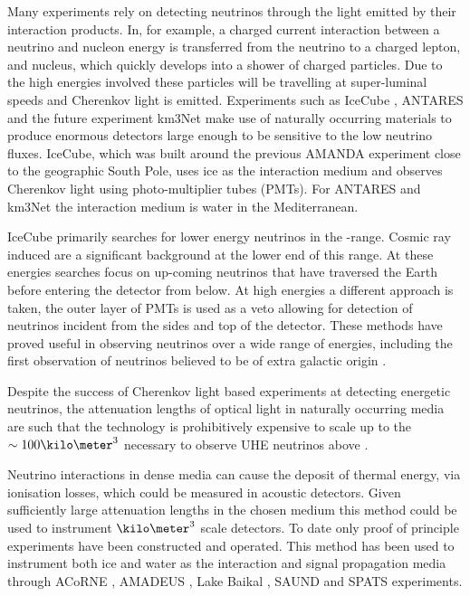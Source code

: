 Many experiments rely on detecting neutrinos through the light emitted by their interaction products. In, for example, a charged current interaction between a neutrino and nucleon energy is transferred from the neutrino to a charged lepton, and nucleus, which quickly develops into a shower of charged particles. Due to the high energies involved these particles will be travelling at super-luminal speeds and Cherenkov light is emitted. Experiments such as IceCube \cite{2010RScI...81h1101H}, ANTARES \cite{2011PhLB..696...16A} and the future experiment km3Net \cite{deJong:2010zza} make use of naturally occurring materials to produce enormous detectors large enough to be sensitive to the low neutrino fluxes. IceCube, which was built around the previous AMANDA \cite{Andres:1999hm} experiment close to the geographic South Pole, uses ice as the interaction medium and observes Cherenkov light using photo-multiplier tubes (PMTs). For ANTARES and km3Net the interaction medium is water in the Mediterranean.

IceCube primarily searches for lower energy neutrinos in the \TeV-\PeV range. Cosmic ray induced \Pmu are a significant background at the lower end of this range. At these energies searches focus on up-coming neutrinos that have traversed the Earth before entering the detector from below. At high energies a different approach is taken, the outer layer of PMTs is used as a veto allowing for detection of neutrinos incident from the sides and top of the detector. These methods have proved useful in observing neutrinos over a wide range of energies, including the first observation of neutrinos believed to be of extra galactic origin \cite{PhysRevLett.111.021103} \cite{Aartsen:2013jdh} \cite{Aartsen:2014gkd}.

Despite the success of Cherenkov light based experiments at detecting energetic neutrinos, the attenuation lengths of optical light in naturally occurring media are such that the technology is prohibitively expensive to scale up to the $\sim 100 \kilo \meter ^3$ necessary to observe UHE neutrinos above \PeV.

Neutrino interactions in dense media can cause the deposit of thermal energy, via ionisation losses, which could be measured in acoustic detectors. Given sufficiently large attenuation lengths in the chosen medium this method could be used to instrument $\kilo \meter ^{3}$ scale detectors. To date only proof of principle experiments have been constructed and operated. This method has been used to instrument both ice and water as the interaction and signal propagation media through ACoRNE \cite{1742-6596-81-1-012011}, AMADEUS \cite{Lahmann2009S158}, Lake Baikal \cite{2009arXiv0910.0678A}, SAUND \cite{Kurahashi:2010ei} and SPATS \cite{Boeser:2008bj} experiments.



